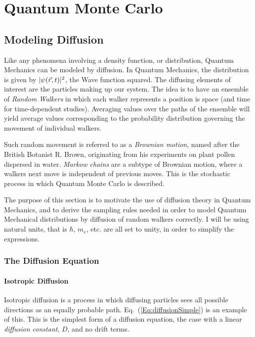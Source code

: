 \chapter{Quantum Monte Carlo}

\section{Modeling Diffusion}

Like any phenomena involving a density function, or distribution, Quantum Mechanics can be modeled by diffusion. In Quantum Mechanics, the distribution is given by $|\psi(\vec r, t)|^2$, the Wave function squared. The diffusing elements of interest are the particles making up our system. The idea is to have an ensemble of \textit{Random Walkers} in which each walker represents a position is space (and time for time-dependent studies). Averaging values over the paths of the ensemble will yield average values corresponding to the probability distribution governing the movement of individual walkers. 

Such random movement is referred to as a \textit{Brownian motion}, named after the British Botanist R. Brown, originating from his experiments on plant pollen dispersed in water. \textit{Markow chains} are a subtype of Brownian motion, where a walkers next move is independent of previous moves. This is the stochastic process in which Quantum Monte Carlo is described.

The purpose of this section is to motivate the use of diffusion theory in Quantum Mechanics, and to derive the sampling rules needed in order to model Quantum Mechanical distributions by diffusion of random walkers correctly. I will be using natural units, that is $\hbar$, $m_e$, etc. are all set to unity, in order to simplify the expressions.

\subsection{The Diffusion Equation}

\subsubsection{Isotropic Diffusion}

Isotropic diffusion is a process in which diffusing particles sees all possible directions as an equally probable path. Eq.~(\ref{Eq:diffusionSimple}) is an example of this. This is the simplest form of a diffusion equation, the case with a linear \textit{diffusion constant}, $D$, and no drift terms.

